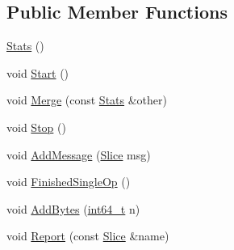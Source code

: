 \subsection*{Public Member Functions}
\begin{DoxyCompactItemize}
\item 
\hyperlink{classleveldb_1_1anonymous__namespace_02db__bench_8cc_03_1_1_stats_a97e33b0731a00dac19e12406bd40729b}{Stats} ()
\item 
void \hyperlink{classleveldb_1_1anonymous__namespace_02db__bench_8cc_03_1_1_stats_a8447537fddbcd678128bd23b4a0dc114}{Start} ()
\item 
void \hyperlink{classleveldb_1_1anonymous__namespace_02db__bench_8cc_03_1_1_stats_a17951c3d50df14358b6960083900d232}{Merge} (const \hyperlink{classleveldb_1_1anonymous__namespace_02db__bench_8cc_03_1_1_stats}{Stats} \&other)
\item 
void \hyperlink{classleveldb_1_1anonymous__namespace_02db__bench_8cc_03_1_1_stats_a78667a4e3ce2fae5575b3454157d63a5}{Stop} ()
\item 
void \hyperlink{classleveldb_1_1anonymous__namespace_02db__bench_8cc_03_1_1_stats_ad15c1814c2c76a3ee89e4f2b0b5ad9ba}{Add\+Message} (\hyperlink{classleveldb_1_1_slice}{Slice} msg)
\item 
void \hyperlink{classleveldb_1_1anonymous__namespace_02db__bench_8cc_03_1_1_stats_a46ebdd6415bc2274ca01939f6665228b}{Finished\+Single\+Op} ()
\item 
void \hyperlink{classleveldb_1_1anonymous__namespace_02db__bench_8cc_03_1_1_stats_a3b6bd65add269ffdbc043661c7ee17f5}{Add\+Bytes} (\hyperlink{stdint_8h_adec1df1b8b51cb32b77e5b86fff46471}{int64\+\_\+t} n)
\item 
void \hyperlink{classleveldb_1_1anonymous__namespace_02db__bench_8cc_03_1_1_stats_a3001cadbb916e3ba7752d1ff21733228}{Report} (const \hyperlink{classleveldb_1_1_slice}{Slice} \&name)
\end{DoxyCompactItemize}
